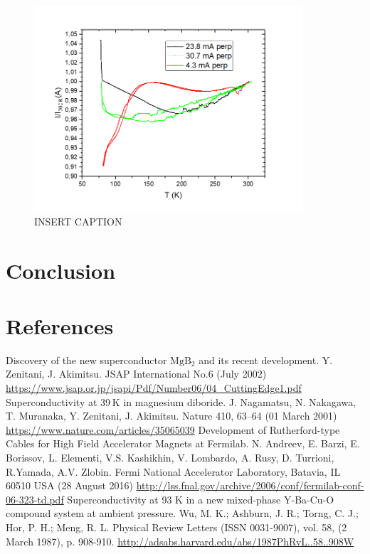 \documentclass{comjnl}
\newcommand*\chem[1]{\ensuremath{\mathrm{#1}}}
\begin{document}
\begin{figure}[h]
\centering
\includegraphics[width=100mm]{Bilde4.png}
\caption{INSERT CAPTION \label{fig:cur_norm}}
\end{figure}

\section{Conclusion} \label{Sec:Conclusion}


\section{References}
\begingroup
\renewcommand{\section}[2]{}
\begin{thebibliography}{}
  Discovery of the new superconductor \chem{MgB_2} and its recent development. 
  Y. Zenitani, J. Akimitsu. 
  JSAP International No.6 (July 2002)
  \url{https://www.jsap.or.jp/jsapi/Pdf/Number06/04_CuttingEdge1.pdf}
  Superconductivity at 39 K in magnesium diboride. 
  J. Nagamatsu, N. Nakagawa, T. Muranaka, Y. Zenitani, J. Akimitsu. 
  Nature 410, 63–64 (01 March 2001)
  \url{https://www.nature.com/articles/35065039}
  Development of Rutherford-type Cables for High Field Accelerator Magnets at Fermilab.
  N. Andreev, E. Barzi, E. Borissov, L. Elementi, V.S. Kashikhin, V. Lombardo, A. Rusy, D. Turrioni, 
R.Yamada, A.V. Zlobin.
   Fermi  National  Accelerator  Laboratory,  Batavia, IL 60510 USA (28 August 2016)
  \url{http://lss.fnal.gov/archive/2006/conf/fermilab-conf-06-323-td.pdf}
  Superconductivity at 93 K in a new mixed-phase Y-Ba-Cu-O compound system at ambient pressure.
  Wu, M. K.; Ashburn, J. R.; Torng, C. J.; Hor, P. H.; Meng, R. L.
  Physical Review Letters (ISSN 0031-9007), vol. 58, (2 March 1987), p. 908-910.
  \url{http://adsabs.harvard.edu/abs/1987PhRvL..58..908W}
\end{thebibliography}
\endgroup
\nocite{*}



\end{document}
